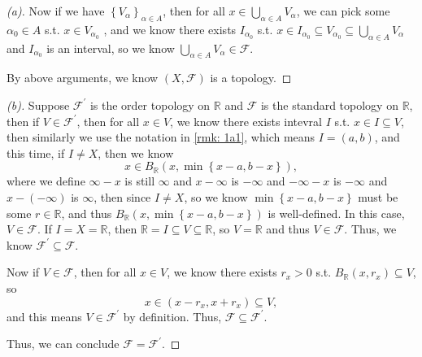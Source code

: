 \begin{proof}[(a)]
  Now if we have \(\left\{ V_\alpha  \right\}_{\alpha \in A} \), then for all \(x \in \bigcup_{\alpha \in A} V_\alpha  \), we can pick some \(\alpha_0 \in A\) s.t. \(x \in V_{\alpha _0}\) , and we know there exists \(I_{\alpha _0}\) s.t. \(x \in I_{\alpha _0} \subseteq V_{\alpha _0} \subseteq \bigcup_{\alpha \in A} V_\alpha  \) and \(I_{\alpha _0}\) is an interval, so we know \(\bigcup_{\alpha \in A} V_\alpha \in \mathcal{F}  \). 
  
  By above arguments, we know \((X, \mathcal{F} )\) is a topology. 
\end{proof}
\begin{proof}[(b)]
  Suppose \(\mathcal{F} ^{\prime} \) is the order topology on \(\mathbb{R} \) and \(\mathcal{F} \) is the standard topology on \(\mathbb{R}  \), then if \(V \in \mathcal{F} ^{\prime} \), then for all \(x \in V\), we know there exists intevral \(I\) s.t. \(x \in I \subseteq V\), then similarly we use the notation in \autoref{rmk: 1a1}, which means \(I = (a, b)\), and this time, if \(I \neq X\), then we know 
  \[
    x \in B_{\mathbb{R} }(x, \min \left\{ x - a, b - x \right\} ),
  \] where we define \(\infty - x\) is still \(\infty \) and \(x - \infty \) is \(-\infty \) and \(-\infty - x\) is \(-\infty \) and \(x - (-\infty )\) is \(\infty \), then since \(I \neq X\), so we know \(\min \left\{ x - a, b - x \right\}\) must be some \(r \in \mathbb{R} \), and thus \(B_{\mathbb{R} } (x, \min \left\{ x-a, b-x \right\} )\) is well-defined. In this case, \(V \in \mathcal{F} \). If \(I = X = \mathbb{R} \), then \(\mathbb{R} = I \subseteq V \subseteq \mathbb{R}  \), so \(V = \mathbb{R} \) and thus \(V \in \mathcal{F} \). Thus, we know \(\mathcal{F} ^{\prime} \subseteq \mathcal{F} \).      
  
  Now if \(V \in \mathcal{F} \), then for all \(x \in V\), we know there exists \(r_x > 0\) s.t. \(B_{\mathbb{R} }(x, r_x) \subseteq V\), so 
  \[
    x \in (x - r_x, x + r_x) \subseteq V,
  \] and this means \(V \in \mathcal{F} ^{\prime} \) by definition. Thus, \(\mathcal{F} \subseteq \mathcal{F} ^{\prime} \). 
  
  Thus, we can conclude \(\mathcal{F} = \mathcal{F} ^{\prime} \). 
\end{proof}
